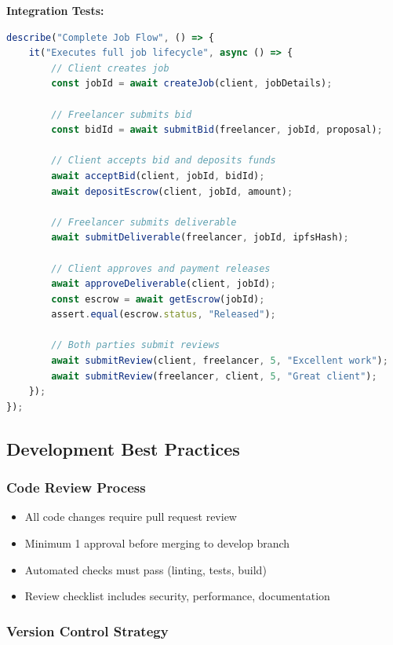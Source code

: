\documentclass[a4paper,13pt,twoside]{report}
\theoremstyle{definition}
\begin{document}
\textbf{Integration Tests:}
\begin{lstlisting}[language=TypeScript, caption=End-to-End Workflow Test]
describe("Complete Job Flow", () => {
    it("Executes full job lifecycle", async () => {
        // Client creates job
        const jobId = await createJob(client, jobDetails);

        // Freelancer submits bid
        const bidId = await submitBid(freelancer, jobId, proposal);

        // Client accepts bid and deposits funds
        await acceptBid(client, jobId, bidId);
        await depositEscrow(client, jobId, amount);

        // Freelancer submits deliverable
        await submitDeliverable(freelancer, jobId, ipfsHash);

        // Client approves and payment releases
        await approveDeliverable(client, jobId);
        const escrow = await getEscrow(jobId);
        assert.equal(escrow.status, "Released");

        // Both parties submit reviews
        await submitReview(client, freelancer, 5, "Excellent work");
        await submitReview(freelancer, client, 5, "Great client");
    });
});
\end{lstlisting}

\subsection{Development Best Practices}

\subsubsection{Code Review Process}

\begin{itemize}
    \item All code changes require pull request review
    \item Minimum 1 approval before merging to develop branch
    \item Automated checks must pass (linting, tests, build)
    \item Review checklist includes security, performance, documentation
\end{itemize}

\subsubsection{Version Control Strategy}
\end{document}
